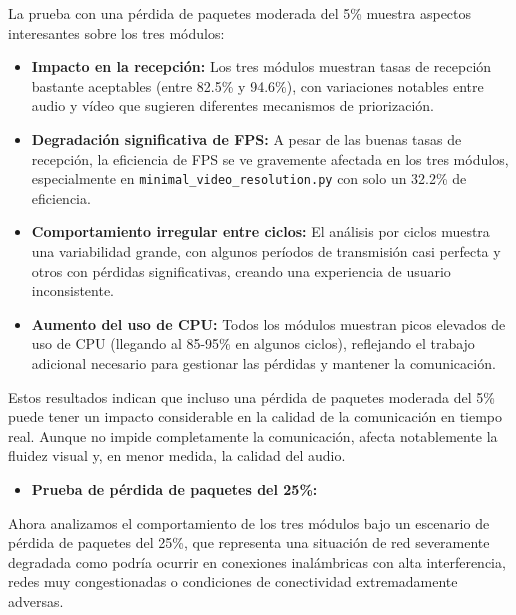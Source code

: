 La prueba con una pérdida de paquetes moderada del 5\% muestra aspectos interesantes sobre los tres módulos:

\begin{itemize}
    \item \textbf{Impacto en la recepción:} Los tres módulos muestran tasas de recepción bastante aceptables (entre 82.5\% y 94.6\%), con variaciones notables entre audio y vídeo que sugieren diferentes mecanismos de priorización.
    
    \item \textbf{Degradación significativa de FPS:} A pesar de las buenas tasas de recepción, la eficiencia de FPS se ve gravemente afectada en los tres módulos, especialmente en \texttt{minimal\_video\_resolution.py} con solo un 32.2\% de eficiencia.
    
    \item \textbf{Comportamiento irregular entre ciclos:} El análisis por ciclos muestra una variabilidad grande, con algunos períodos de transmisión casi perfecta y otros con pérdidas significativas, creando una experiencia de usuario inconsistente.
    
    \item \textbf{Aumento del uso de CPU:} Todos los módulos muestran picos elevados de uso de CPU (llegando al 85-95\% en algunos ciclos), reflejando el trabajo adicional necesario para gestionar las pérdidas y mantener la comunicación.
\end{itemize}

Estos resultados indican que incluso una pérdida de paquetes moderada del 5\% puede tener un impacto considerable en la calidad de la comunicación en tiempo real. Aunque no impide completamente la comunicación, afecta notablemente la fluidez visual y, en menor medida, la calidad del audio.

\newpage

\begin{itemize}
  \item \textbf{Prueba de pérdida de paquetes del 25\%:}
\end{itemize}

Ahora analizamos el comportamiento de los tres módulos bajo un escenario de pérdida de paquetes del 25\%, que representa una situación de red severamente degradada como podría ocurrir en conexiones inalámbricas con alta interferencia, redes muy congestionadas o condiciones de conectividad extremadamente adversas.

\vspace{\baselineskip}

